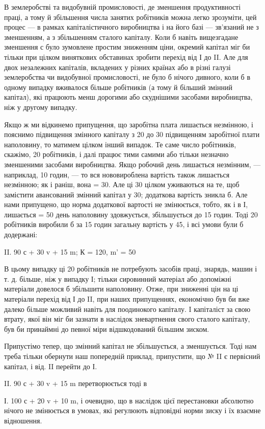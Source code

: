 В землеробстві та видобувній промисловості, де зменшення
продуктивності праці, а тому й збільшення числа занятих робітників
можна легко зрозуміти, цей процес — в рамках капіталістичного
виробництва і на його базі — зв’язаний не з зменшенням,
а з збільшенням сталого капіталу. Коли б навіть вищезгадане
зменшення с було зумовлене простим зниженням ціни,
окремий капітал міг би тільки при цілком виняткових обставинах
зробити перехід від І до II. Але для двох незалежних капіталів,
вкладених у різних країнах або в різні галузі землеробства чи
видобувної промисловості, не було б нічого дивного, коли б
в одному випадку вживалося більше робітників (а тому й більший
змінний капітал), які працюють менш дорогими або скуднішими
засобами виробництва, ніж у другому випадку.

Якщо ж ми відкинемо припущення, що заробітна плата лишається
незмінною, і пояснимо підвищення змінного капіталу
з 20 до 30 підвищенням заробітної плати наполовину, то матимем
цілком інший випадок. Те саме число робітників, скажімо,
20 робітників, і далі працює тими самими або тільки незначно
зменшеними засобами виробництва. Якщо робочий день лишається
незмінним, — наприклад, 10 годин, — то вся нововироблена
вартість також лишається незмінною; як і раніш, вона = 30.
Але ці 30 цілком уживаються на те, щоб замістити авансований
змінний капітал у 30; додаткова вартість зникла б. Але нами
припущено, що норма додаткової вартості не змінюється, тобто,
як і в І, лишається = 50%
день наполовину здовжується, збільшується до 15 годин.
Тоді 20 робітників виробили б за 15 годин загальну вартість
у 45, і всі умови були б додержані:

II. 90 с + 30 v + 15 m; К = 120, m' = 50%

В цьому випадку ці 20 робітників не потребують засобів
праці, знарядь, машин і т. д. більше, ніж у випадку І; тільки
сировинний матеріал або допоміжні матеріали довелося б збільшити
наполовину. Отже, при зниженні цін на ці матеріали
перехід від І до II, при наших припущеннях, економічно був би
вже далеко більше можливий навіть для поодинокого капіталу.
I капіталіст за свою втрату, якої він міг би зазнати в наслідок
зневартнення свого сталого капіталу, був би принаймні до певної
міри відшкодований більшим зиском.

Припустімо тепер, що змінний капітал не збільшується,
а зменшується. Тоді нам треба тільки обернути наш попередній
приклад, припустити, що № II є первісний капітал, і від.
II перейти до І.

II. 90 с + 30 v + 15 m перетворюється тоді в

І. 100 с + 20 v + 10 m, і очевидно, що в наслідок цієї перестановки
абсолютно нічого не змінюється в умовах, які регулюють
відповідні норми зиску і їх взаємне відношення.
